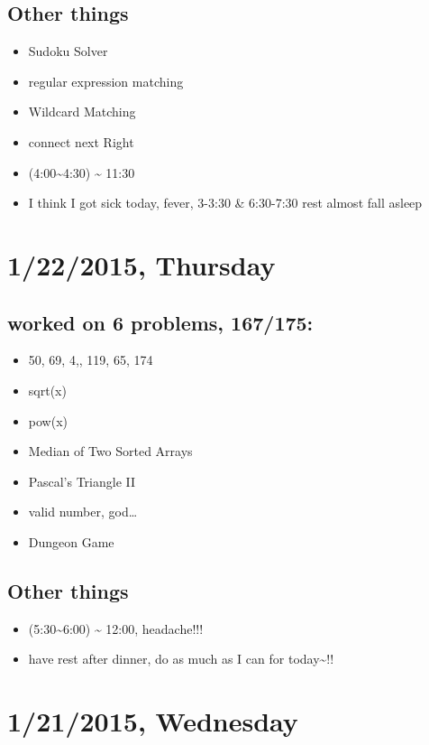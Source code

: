 \documentclass[9pt,b5paper]{article}
\begin{document}
\subsection{Other things}
\label{sec-4-2}
\begin{itemize}
\item Sudoku Solver
\item regular expression matching
\item Wildcard Matching
\item connect next Right
\item (4:00\textasciitilde{}4:30) \textasciitilde{} 11:30
\item I think I got sick today, fever, 3-3:30 \& 6:30-7:30 rest almost fall asleep
\end{itemize}
\section{1/22/2015, Thursday}
\label{sec-5}
\subsection{worked on 6 problems, 167/175:}
\label{sec-5-1}
\begin{itemize}
\item 50, 69, 4,, 119, 65, 174
\item sqrt(x)
\item pow(x)
\item Median of Two Sorted Arrays
\item Pascal's Triangle II
\item valid number, god\ldots{}
\item Dungeon Game
\end{itemize}
\subsection{Other things}
\label{sec-5-2}
\begin{itemize}
\item (5:30\textasciitilde{}6:00) \textasciitilde{} 12:00, headache!!!
\item have rest after dinner, do as much as I can for today\textasciitilde{}!!
\end{itemize}
\section{1/21/2015, Wednesday}
\label{sec-6}
\end{document}

